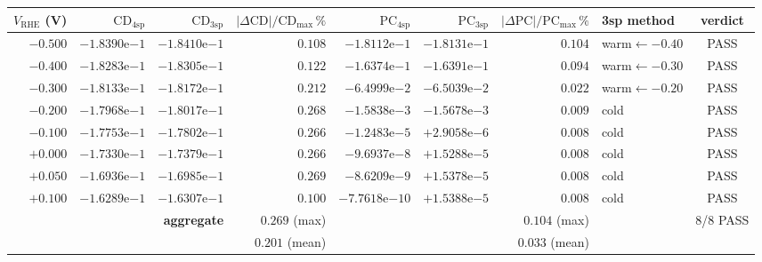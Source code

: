 \documentclass[11pt]{article}
\newcommand{\VRHE}{V_{\mathrm{RHE}}}
\begin{document}
\begingroup
\small
\setlength{\tabcolsep}{4pt}
\renewcommand{\arraystretch}{1.05}
\begin{center}
\begin{tabular}{r r r r r r r l c}
\toprule
$\VRHE$ (V) & $\mathrm{CD}_{\mathrm{4sp}}$ & $\mathrm{CD}_{\mathrm{3sp}}$
            & $|\Delta \mathrm{CD}|/\mathrm{CD}_{\max}\,\%$
            & $\mathrm{PC}_{\mathrm{4sp}}$ & $\mathrm{PC}_{\mathrm{3sp}}$
            & $|\Delta \mathrm{PC}|/\mathrm{PC}_{\max}\,\%$
            & 3sp method & verdict \\
\midrule
$-0.500$ & $-1.8390\mathrm{e}{-1}$ & $-1.8410\mathrm{e}{-1}$ & $0.108$
         & $-1.8112\mathrm{e}{-1}$ & $-1.8131\mathrm{e}{-1}$ & $0.104$
         & warm$\leftarrow{-0.40}$ & PASS \\
$-0.400$ & $-1.8283\mathrm{e}{-1}$ & $-1.8305\mathrm{e}{-1}$ & $0.122$
         & $-1.6374\mathrm{e}{-1}$ & $-1.6391\mathrm{e}{-1}$ & $0.094$
         & warm$\leftarrow{-0.30}$ & PASS \\
$-0.300$ & $-1.8133\mathrm{e}{-1}$ & $-1.8172\mathrm{e}{-1}$ & $0.212$
         & $-6.4999\mathrm{e}{-2}$ & $-6.5039\mathrm{e}{-2}$ & $0.022$
         & warm$\leftarrow{-0.20}$ & PASS \\
$-0.200$ & $-1.7968\mathrm{e}{-1}$ & $-1.8017\mathrm{e}{-1}$ & $0.268$
         & $-1.5838\mathrm{e}{-3}$ & $-1.5678\mathrm{e}{-3}$ & $0.009$
         & cold & PASS \\
$-0.100$ & $-1.7753\mathrm{e}{-1}$ & $-1.7802\mathrm{e}{-1}$ & $0.266$
         & $-1.2483\mathrm{e}{-5}$ & $+2.9058\mathrm{e}{-6}$ & $0.008$
         & cold & PASS \\
$+0.000$ & $-1.7330\mathrm{e}{-1}$ & $-1.7379\mathrm{e}{-1}$ & $0.266$
         & $-9.6937\mathrm{e}{-8}$ & $+1.5288\mathrm{e}{-5}$ & $0.008$
         & cold & PASS \\
$+0.050$ & $-1.6936\mathrm{e}{-1}$ & $-1.6985\mathrm{e}{-1}$ & $0.269$
         & $-8.6209\mathrm{e}{-9}$ & $+1.5378\mathrm{e}{-5}$ & $0.008$
         & cold & PASS \\
$+0.100$ & $-1.6289\mathrm{e}{-1}$ & $-1.6307\mathrm{e}{-1}$ & $0.100$
         & $-7.7618\mathrm{e}{-10}$ & $+1.5388\mathrm{e}{-5}$ & $0.008$
         & cold & PASS \\
\midrule
\multicolumn{3}{r}{\textbf{aggregate}} & $\mathbf{0.269}$ (max)
         & & & $\mathbf{0.104}$ (max) & & 8/8 PASS \\
\multicolumn{3}{r}{} & $0.201$ (mean) & & & $0.033$ (mean) & & \\
\bottomrule
\end{tabular}
\end{center}
\endgroup
\end{document}

